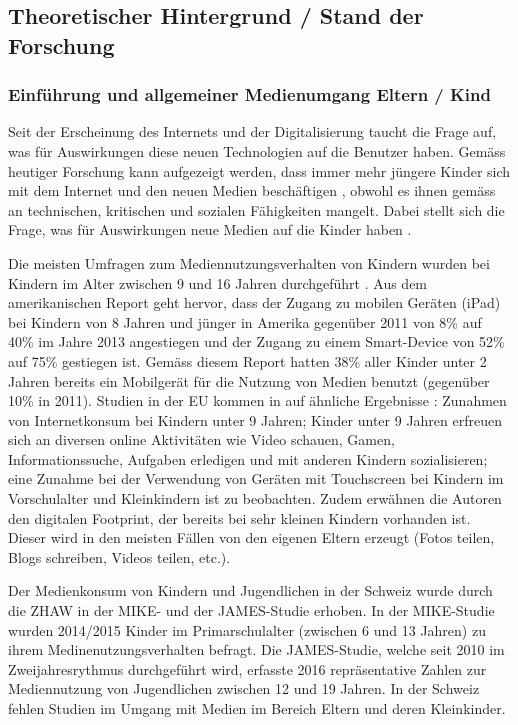 \subsection{Theoretischer Hintergrund / Stand der Forschung}
\subsubsection{Einführung und allgemeiner Medienumgang Eltern / Kind}
Seit der Erscheinung des Internets und der Digitalisierung taucht die Frage auf, was für Auswirkungen diese neuen Technologien auf die Benutzer haben. Gemäss heutiger Forschung kann aufgezeigt werden, dass immer mehr jüngere Kinder sich mit dem Internet und den neuen Medien beschäftigen \cite{Rideout2013a, Chaudron2015}, obwohl es ihnen gemäss  an technischen, kritischen und sozialen Fähigkeiten mangelt. Dabei stellt sich die Frage, was für Auswirkungen neue Medien auf die Kinder haben \cite{Tomopoulos2010, Pempek2014, Livingstone2015, Masur2015, Troseth2016}. 

Die meisten Umfragen zum Mediennutzungsverhalten von Kindern wurden bei Kindern im Alter zwischen 9 und 16 Jahren durchgeführt \cite{Chaudron2015}. Aus dem amerikanischen Report  geht hervor, dass der Zugang zu mobilen Geräten (iPad) bei Kindern von 8 Jahren und jünger in Amerika gegenüber 2011 von 8\% auf 40\% im Jahre 2013 angestiegen und der Zugang zu einem Smart-Device von 52\% auf 75\% gestiegen ist. Gemäss diesem Report hatten 38\% aller Kinder unter 2 Jahren bereits ein Mobilgerät für die Nutzung von Medien benutzt (gegenüber 10\% in 2011). Studien in der EU kommen in auf ähnliche Ergebnisse \cite{Holloway2013}: Zunahmen von Internetkonsum bei Kindern unter 9 Jahren; Kinder unter 9 Jahren erfreuen sich an diversen online Aktivitäten wie Video schauen, Gamen, Informationssuche, Aufgaben erledigen und mit anderen Kindern sozialisieren; eine Zunahme bei der Verwendung von Geräten mit Touchscreen bei Kindern im Vorschulalter und Kleinkindern ist zu beobachten. Zudem erwähnen die Autoren den digitalen Footprint, der bereits bei sehr kleinen Kindern vorhanden ist. Dieser wird in den meisten Fällen von den eigenen Eltern erzeugt (Fotos teilen, Blogs schreiben, Videos teilen, etc.).

Der Medienkonsum von Kindern und Jugendlichen in der Schweiz wurde durch die ZHAW in der MIKE- und der JAMES-Studie \cite{Suter2015, Waller2016} erhoben. In der MIKE-Studie wurden 2014/2015 Kinder im Primarschulalter (zwischen 6 und 13 Jahren) zu ihrem Medinenutzungsverhalten befragt. Die JAMES-Studie, welche seit 2010 im Zweijahresrythmus durchgeführt wird, erfasste 2016 repräsentative Zahlen zur Mediennutzung von Jugendlichen zwischen 12 und 19 Jahren. In der Schweiz fehlen Studien im Umgang mit Medien im Bereich Eltern und deren Kleinkinder. 

